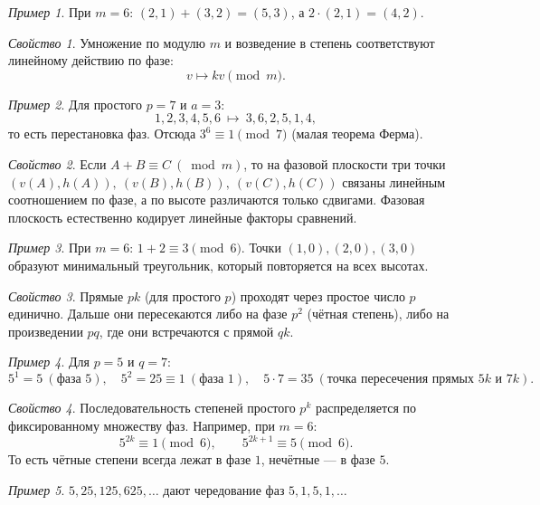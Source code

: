 \documentclass[12pt,a4paper]{article}
\theoremstyle{definition}
\theoremstyle{plain}
\theoremstyle{remark}
\newtheorem*{example}{Пример}
\newtheorem*{property}{Свойство}
\begin{document}
\begin{example}
При $m=6$: $(2,1)+(3,2)=(5,3)$, а $2\cdot(2,1)=(4,2)$.
\end{example}

\begin{property}
Умножение по модулю $m$ и возведение в степень соответствуют линейному действию по фазе:
\[
v \mapsto kv \pmod m.
\]
\end{property}

\begin{example}
Для простого $p=7$ и $a=3$:
\[
1,2,3,4,5,6 \ \mapsto\ 3,6,2,5,1,4,
\]
то есть перестановка фаз. Отсюда $3^6\equiv 1\pmod 7$ (малая теорема Ферма).
\end{example}

\begin{property}
Если $A+B\equiv C\ (\bmod m)$, то на фазовой плоскости три точки
$(v(A),h(A)),\ (v(B),h(B)),\ (v(C),h(C))$ связаны линейным соотношением по фазе,
а по высоте различаются только сдвигами. Фазовая плоскость
естественно кодирует линейные факторы сравнений.
\end{property}

\begin{example}
При $m=6$: $1+2\equiv 3\pmod 6$.
Точки $(1,0),(2,0),(3,0)$ образуют минимальный треугольник,
который повторяется на всех высотах.
\end{example}

\begin{property}
Прямые $pk$ (для простого $p$) проходят через простое число $p$ единично.
Дальше они пересекаются либо на фазе $p^2$ (чётная степень),
либо на произведении $pq$, где они встречаются с прямой $qk$.
\end{property}

\begin{example}
Для $p=5$ и $q=7$:
\[
5^1=5 \ (\text{фаза }5),\quad
5^2=25\equiv 1 \ (\text{фаза }1),\quad
5\cdot 7=35 \ (\text{точка пересечения прямых } 5k \text{ и } 7k).
\]
\end{example}

\begin{property}
Последовательность степеней простого $p^k$ распределяется по фиксированному множеству фаз.
Например, при $m=6$:
\[
5^{2k}\equiv 1\pmod 6,\qquad 5^{2k+1}\equiv 5\pmod 6.
\]
То есть чётные степени всегда лежат в фазе $1$, нечётные — в фазе $5$.
\end{property}

\begin{example}
$5,25,125,625,\dots$ дают чередование фаз $5,1,5,1,\dots$
\end{example}
\end{document}
